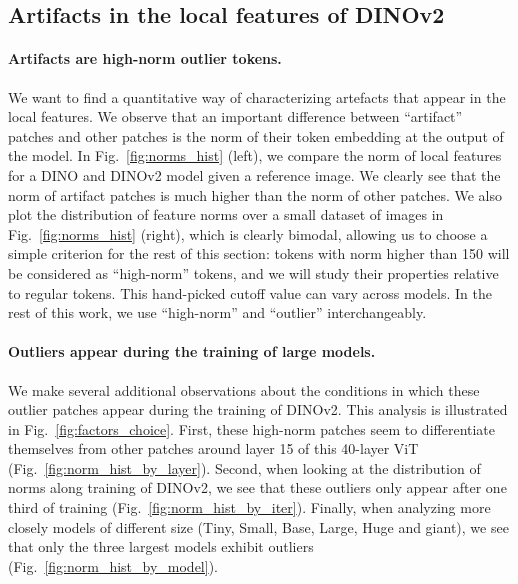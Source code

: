 \documentclass{article} \usepackage{iclr2024_conference,times}
\newcommand{\new}[1]{{#1}}
\newcommand{\old}[1]{}
\begin{document}
\subsection{Artifacts in the local features of DINOv2}
\label{subsec:artifacts}

\paragraph{Artifacts are high-norm outlier tokens.}
We want to find a quantitative way of characterizing\old{the} artefacts that appear in the local features.
We observe that an important difference between ``artifact'' patches and other patches is the norm of their token embedding at the output of the model.
In Fig.~\ref{fig:norms_hist} (left), we \old{show}\new{compare} the norm of local features for a DINO and DINOv2 model \old{for}\new{given} a reference image.
We clearly see that the norm of artifact patches is much higher than the norm of other patches.
We also plot the distribution of feature norms over a small dataset of images in Fig.~\ref{fig:norms_hist} (right), \new{which is clearly bimodal}, allowing us to choose a simple criterion for the rest of this section: tokens with norm higher than 150 will be considered as ``high-norm'' tokens, and we will study their properties relative to regular tokens. 
This hand-picked cutoff value can vary across models. 
In the rest of this work, we use ``high-norm'' and ``outlier'' interchangeably.

\paragraph{Outliers appear during the training of \old{larger}\new{large} models.}
We make several additional observations about the conditions in which these outlier patches appear \old{in}\new{during} the training of DINOv2.
This analysis is illustrated in Fig.~\ref{fig:factors_choice}.
First, these high-norm patches seem to differentiate themselves from other patches around layer 15 of this 40-layer ViT (Fig.~\ref{fig:norm_hist_by_layer}).
Second, when looking at the distribution of norms along training of DINOv2, we see that these outliers only appear after one third of training (Fig.~\ref{fig:norm_hist_by_iter}).
Finally, when analyzing more closely models of different size (Tiny, Small, Base, Large, Huge and giant), we see that only the \old{larger}\new{three largest} models \old{suffer from}\new{exhibit} outliers (Fig.~\ref{fig:norm_hist_by_model}).
\end{document}
